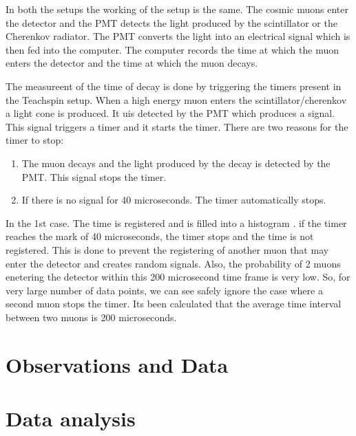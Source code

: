 \documentclass{article}
\begin{document}
\begin{multicols}{2}
In both the setups the working of the setup is the same. The cosmic muons enter the detector and the PMT detects the light produced by the scintillator or the Cherenkov radiator. The PMT converts the light into an electrical signal which is then fed into the computer. The computer records the time at which the muon enters the detector and the time at which the muon decays.

The measureent of the time of decay is done by triggering the timers present in the Teachspin setup. When a high energy muon enters the scintillator/cherenkov a light cone is produced. It uis detected by the PMT which produces a signal. This signal triggers a timer and it starts the timer. There are two reasons for the timer to stop:
\begin{enumerate}
    \item The muon decays and the light produced by the decay is detected by the PMT. This signal stops the timer.
    \item If there is no signal for 40 microseconds. The timer automatically stops.
\end{enumerate}

In the 1st case. The time is registered and is filled into a histogram . if the timer reaches the mark of 40 microseconds, the timer stops and the time is not registered. This is done to prevent the registering of another muon that may enter the detector and creates random signals.
Also, the probability of 2 muons enetering the detector within this 200 microsecond time frame is very low. So, for very large number of data points, we can see safely ignore the case where a second muon stops the timer. Its been calculated that the average time interval between two muons is 200 microseconds.

\section{\label{observations}Observations and Data}

\section{\label{dataanalysis}Data analysis}

\end{multicols}
\end{document}
